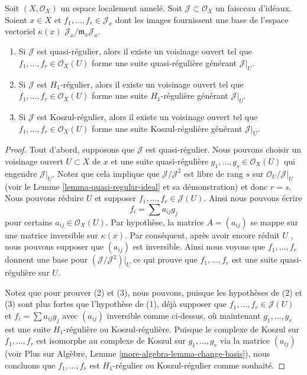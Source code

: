\begin{lemma}
\label{lemma-generate-regular-ideal}
Soit  $(X, \mathcal{O}_X)$  un espace localement annelé. Soit  $\mathcal{J} \subset \mathcal{O}_X$  un faisceau
d'idéaux. Soient  $x \in X$  et  $f_1, \ldots, f_r \in \mathcal{J}_x$  dont les images fournissent une base
de l'espace vectoriel  $\kappa(x)$  $\mathcal{J}_x/\mathfrak m_x\mathcal{J}_x$.
\begin{enumerate}
\item Si  $\mathcal{J}$  est quasi-régulier, alors il existe un voisinage ouvert tel que
 $f_1, \ldots, f_r \in \mathcal{O}_X(U)$  forme une suite quasi-régulière générant  $\mathcal{J}|_U$.
\item Si  $\mathcal{J}$  est  $H_1$-régulier, alors il existe un voisinage ouvert tel
que  $f_1, \ldots, f_r \in \mathcal{O}_X(U)$  forme une suite  $H_1$-régulière générant  $\mathcal{J}|_U$.
\item Si  $\mathcal{J}$  est Koszul-régulier, alors il existe un voisinage ouvert tel que
 $f_1, \ldots, f_r \in \mathcal{O}_X(U)$  forme une suite Koszul-régulière générant  $\mathcal{J}|_U$.
\end{enumerate}
\end{lemma}

\begin{proof}
Tout d'abord, supposons que  $\mathcal{J}$  est quasi-régulier. Nous pouvons choisir
un voisinage ouvert  $U \subset X$  de  $x$  et une suite quasi-régulière
 $g_1, \ldots, g_s \in \mathcal{O}_X(U)$  qui engendre  $\mathcal{J}|_U$. Notez que cela implique que  $\mathcal{J}/\mathcal{J}^2$ 
est libre de rang  $s$  sur  $\mathcal{O}_U/\mathcal{J}|_U$  (voir le Lemme  \ref{lemma-quasi-regular-ideal}  et sa
démonstration) et donc  $r = s$. Nous pouvons réduire  $U$  et supposer
 $f_1, \ldots, f_r \in \mathcal{J}(U)$. Ainsi nous pouvons écrire
$$
f_i = \sum a_{ij} g_j
$$
pour certains  $a_{ij} \in \mathcal{O}_X(U)$. Par hypothèse, la matrice  $A = (a_{ij})$  se mappe sur
une matrice inversible sur  $\kappa(x)$. Par conséquent, après avoir encore réduit
 $U$ , nous pouvons supposer que  $(a_{ij})$  est inversible. Ainsi nous
voyons que  $f_1, \ldots, f_r$  donnent une base pour  $(\mathcal{J}/\mathcal{J}^2)|_U$  ce qui prouve que
 $f_1, \ldots, f_r$  est une suite quasi-régulière sur  $U$.

\medskip\noindent
Notez que pour prouver (2) et (3), nous pouvons, puisque les hypothèses de (2) et
(3) sont plus fortes que l'hypothèse de (1), déjà supposer que  $f_1, \ldots, f_r \in \mathcal{J}(U)$  et
 $f_i = \sum a_{ij}g_j$  avec  $(a_{ij})$  inversible comme ci-dessus, où maintenant
 $g_1, \ldots, g_r$  est une suite  $H_1$-régulière ou Koszul-régulière. Puisque le
complexe de Koszul sur  $f_1, \ldots, f_r$  est isomorphe au complexe de Koszul sur
 $g_1, \ldots, g_r$  via la matrice  $(a_{ij})$  (voir Plus sur Algèbre, Lemme
 \ref{more-algebra-lemma-change-basis}), nous concluons que  $f_1, \ldots, f_r$  est  $H_1$-régulier ou
Koszul-régulier comme souhaité.
\end{proof}

